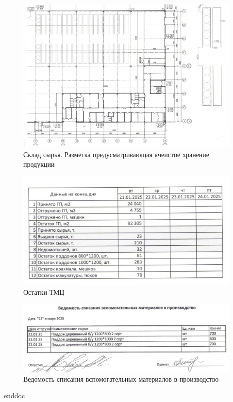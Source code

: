 \begin{figure}
\begin{center}
\includegraphics[height=0.94\textheight, width=\textwidth, angle=90, keepaspectratio]{Pics/f4.jpg}
\end{center}
\caption{Склад сырья. Разметка предусматривающая ячеистое хранение продукции}
\label{pic:f4}
\end{figure}

\begin{figure}
\begin{center}
\includegraphics[height=0.94\textheight, width=\textwidth, keepaspectratio]{Pics/f2.jpg}
\end{center}
\caption{Остатки ТМЦ}
\label{pic:f2}
\end{figure}

\begin{figure}
\begin{center}
\includegraphics[height=0.94\textheight, width=\textwidth, keepaspectratio]{Pics/f27.jpg}
\end{center}
\caption{Ведомость списания вспомогательных материалов в производство}
\label{pic:f27}
\end{figure}

\clearpage
 {enddoc}